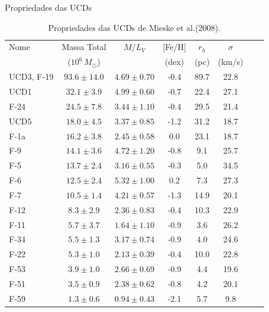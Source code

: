 \begin{frame}[c]{Propriedades das UCDs}
    \vspace{0.2cm}
    \begin{table}[h]
        \centering
        \scriptsize
        \caption{Propriedades das UCDs de Mieske et al.(2008).}
        \begin{tabular}{lccccccc}
        \toprule
        Nome & Massa Total & $M/L_V$ & [Fe/H] & $r_h$ & $\sigma$ \\
        & ($10^6 \, M_\odot$) & & (dex) & (pc) & (km/s)\\
        \midrule
        UCD3, F-19 & $93.6 \pm 14.0$ & $4.69 \pm 0.70$ & -0.4 & 89.7 & 22.8 \\
        UCD1       & $32.1 \pm 3.9$  & $4.99 \pm 0.60$ & -0.7 & 22.4 & 27.1 \\
        F-24       & $24.5 \pm 7.8$  & $3.44 \pm 1.10$ & -0.4 & 29.5 & 21.4 \\
        UCD5       & $18.0 \pm 4.5$  & $3.37 \pm 0.85$ & -1.2 & 31.2 & 18.7 \\
        F-1a       & $16.2 \pm 3.8$  & $2.45 \pm 0.58$ & 0.0  & 23.1 & 18.7 \\
        F-9        & $14.1 \pm 3.6$  & $4.72 \pm 1.20$ & -0.8 & 9.1  & 25.7 \\
        F-5        & $13.7 \pm 2.4$  & $3.16 \pm 0.55$ & -0.3 & 5.0  & 34.5 \\
        F-6        & $12.5 \pm 2.4$  & $5.32 \pm 1.00$ & 0.2  & 7.3  & 27.3 \\
        F-7        & $10.5 \pm 1.4$  & $4.21 \pm 0.57$ & -1.3 & 14.9 & 20.1 \\
        F-12       & $8.3 \pm 2.9$   & $2.36 \pm 0.83$ & -0.4 & 10.3 & 22.9 \\
        F-11       & $5.7 \pm 3.7$   & $1.64 \pm 1.10$ & -0.9 & 3.6  & 26.2 \\
        F-34       & $5.5 \pm 1.3$   & $3.17 \pm 0.74$ & -0.9 & 4.0  & 24.6 \\
        F-22       & $5.3 \pm 1.0$   & $2.13 \pm 0.39$ & -0.4 & 10.0 & 22.8 \\
        F-53       & $3.9 \pm 1.0$   & $2.66 \pm 0.69$ & -0.9 & 4.4  & 19.6 \\
        F-51       & $3.5 \pm 0.9$   & $2.38 \pm 0.62$ & -0.8 & 4.2  & 20.1 \\
        F-59       & $1.3 \pm 0.6$   & $0.94 \pm 0.43$ & -2.1 & 5.7  & 9.8  \\
        \bottomrule
        \end{tabular}
        \label{ucds_fornax_propriedades}
    \end{table}
\end{frame}

